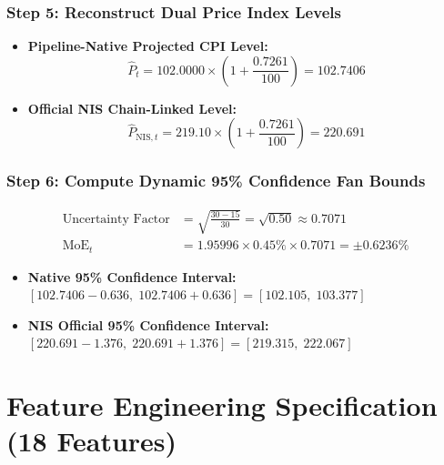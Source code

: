 \documentclass[11pt,a4paper]{article}
\begin{document}
\subsubsection*{Step 5: Reconstruct Dual Price Index Levels}
\begin{itemize}
    \item \textbf{Pipeline-Native Projected CPI Level:}
    \begin{equation*}
        \hat{P}_t = 102.0000 \times \left( 1 + \frac{0.7261}{100} \right) = \mathbf{102.7406}
    \end{equation*}
    \item \textbf{Official NIS Chain-Linked Level:}
    \begin{equation*}
        \hat{P}_{\text{NIS}, t} = 219.10 \times \left( 1 + \frac{0.7261}{100} \right) = \mathbf{220.691}
    \end{equation*}
\end{itemize}

\subsubsection*{Step 6: Compute Dynamic 95\% Confidence Fan Bounds}
\begin{align*}
    \text{Uncertainty Factor} &= \sqrt{\frac{30 - 15}{30}} = \sqrt{0.50} \approx 0.7071 \\
    \text{MoE}_t &= 1.95996 \times 0.45\% \times 0.7071 = \mathbf{\pm 0.6236\%}
\end{align*}
\begin{itemize}
    \item \textbf{Native 95\% Confidence Interval:} $[102.7406 - 0.636, \; 102.7406 + 0.636] = \mathbf{[102.105, \; 103.377]}$
    \item \textbf{NIS Official 95\% Confidence Interval:} $[220.691 - 1.376, \; 220.691 + 1.376] = \mathbf{[219.315, \; 222.067]}$
\end{itemize}

\section{Feature Engineering Specification (18 Features)}
\end{document}
